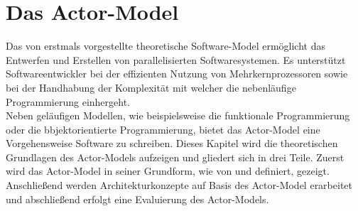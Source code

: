 \chapter{Das Actor-Model} \label{actor:chapter}
Das von \cite{hewitt1973session} erstmals vorgestellte theoretische Software-Model ermöglicht das Entwerfen und Erstellen von parallelisierten Softwaresystemen. Es unterstützt Softwareentwickler bei der effizienten Nutzung von Mehrkernprozessoren sowie bei der Handhabung der Komplexität mit welcher die nebenläufige Programmierung einhergeht.  
\\
Neben geläufigen Modellen, wie beispielsweise die funktionale Programmierung oder die bbjektorientierte Programmierung, bietet das Actor-Model eine Vorgehensweise Software zu schreiben. Dieses Kapitel wird die theoretischen Grundlagen des Actor-Models aufzeigen und gliedert sich in drei Teile. Zuerst wird das Actor-Model in seiner Grundform, wie von \cite{hewitt1973session} und \cite{Agha1985ActorsSystems} definiert, gezeigt. Anschließend werden Architekturkonzepte auf Basis des Actor-Model erarbeitet und abschließend erfolgt eine Evaluierung des Actor-Models.



